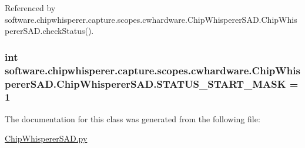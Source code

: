 Referenced by software.\+chipwhisperer.\+capture.\+scopes.\+cwhardware.\+Chip\+Whisperer\+S\+A\+D.\+Chip\+Whisperer\+S\+A\+D.\+check\+Status().

\hypertarget{classsoftware_1_1chipwhisperer_1_1capture_1_1scopes_1_1cwhardware_1_1ChipWhispererSAD_1_1ChipWhispererSAD_a541ee5249969a00a210adee5f62e58d5}{}
\subsubsection[{S\+T\+A\+T\+U\+S\+\_\+\+S\+T\+A\+R\+T\+\_\+\+M\+A\+S\+K}]{\setlength{\rightskip}{0pt plus 5cm}int software.\+chipwhisperer.\+capture.\+scopes.\+cwhardware.\+Chip\+Whisperer\+S\+A\+D.\+Chip\+Whisperer\+S\+A\+D.\+S\+T\+A\+T\+U\+S\+\_\+\+S\+T\+A\+R\+T\+\_\+\+M\+A\+S\+K = 1\hspace{0.3cm}{\ttfamily [static]}}\label{classsoftware_1_1chipwhisperer_1_1capture_1_1scopes_1_1cwhardware_1_1ChipWhispererSAD_1_1ChipWhispererSAD_a541ee5249969a00a210adee5f62e58d5}


The documentation for this class was generated from the following file\+:\begin{DoxyCompactItemize}
\item 
\hyperlink{ChipWhispererSAD_8py}{Chip\+Whisperer\+S\+A\+D.\+py}\end{DoxyCompactItemize}
